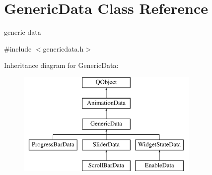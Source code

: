 \hypertarget{class_generic_data}{}\section{Generic\+Data Class Reference}
\label{class_generic_data}


generic data  




{\ttfamily \#include $<$genericdata.\+h$>$}

Inheritance diagram for Generic\+Data\+:\begin{figure}[H]
\begin{center}
\leavevmode
\includegraphics[height=5.000000cm]{class_generic_data}
\end{center}
\end{figure}
